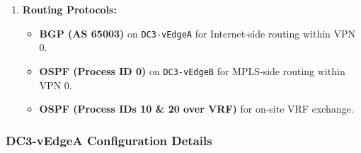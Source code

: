 \documentclass[12pt,english]{report}
\begin{document}
\begin{enumerate}
    \item \textbf{Routing Protocols:}
    \begin{itemize}
        \item \textbf{BGP (AS 65003)} on \texttt{DC3‑vEdgeA} for Internet‑side routing within VPN 0.
        \item \textbf{OSPF (Process ID 0)} on \texttt{DC3‑vEdgeB} for MPLS‑side routing within VPN 0.
        \item \textbf{OSPF (Process IDs 10 \& 20 over VRF)} for on‑site VRF exchange.
    \end{itemize}
\end{enumerate}
\subsubsection{DC3-vEdgeA Configuration Details}
\end{document}
